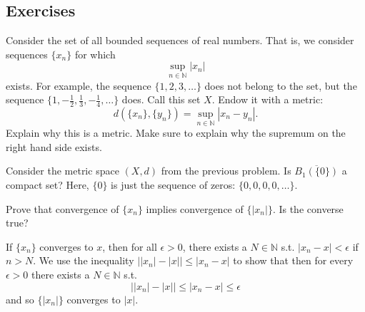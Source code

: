 \subsection{Exercises}

  \begin{exercise}
    Consider the set of all bounded sequences of real numbers. That is, we
    consider sequences $\{x_n\}$ for which
    \begin{equation}
      \sup_{n\in\mathbb{N}} |x_n|
    \end{equation}
    exists. For example, the sequence $\{1,2,3,\ldots\}$ does not belong to the set,
    but the sequence $\{1,-\frac{1}{2},\frac{1}{3},-\frac{1}{4},\ldots\}$ does. Call this set $X$. Endow it with
    a metric:
    \begin{equation}
      d(\{x_n\},\{y_n\}) = \sup_{n\in\mathbb{N}} |x_n - y_n|.
    \end{equation}
    Explain why this is a metric. Make sure to explain why the supremum on
    the right hand side exists.
  \end{exercise}

  \begin{exercise}
    Consider the metric space $(X,d)$ from the previous problem. Is $\overline{B_1(\{0\})}$
    a compact set? Here, $\{0\}$ is just the sequence of zeros: $\{0,0,0,0,\ldots\}$.
  \end{exercise}
  
  \begin{exercise}
    Prove that convergence of $\{x_n\}$ implies convergence of $\{|x_n|\}$. Is the converse true? 
  \end{exercise}
  \begin{solution}
    If $\{x_n\}$ converges to $x$, then for all $\epsilon > 0$, there exists a $N \in \mathbb{N}$ s.t. $|x_n - x| < \epsilon$ if $n > N$. We use the inequality $\big| |x_n| - |x| \big| \leq |x_n - x|$ to show that then for every $\epsilon > 0$ there exists a $N \in \mathbb{N}$ s.t. 
    \[ \big| |x_n| - |x| \big| \leq |x_n - x| \leq \epsilon \]
    and so $\{|x_n|\}$ converges to $|x|$. 
  \end{solution}

